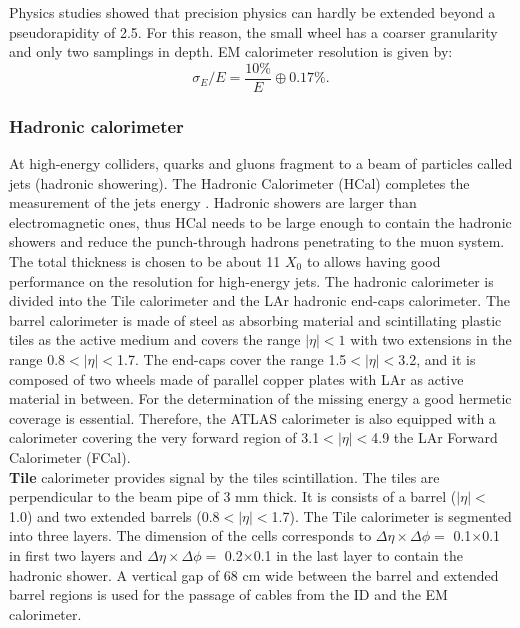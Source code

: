 Physics studies showed that precision physics can hardly be extended beyond a pseudorapidity of 2.5. For this reason, the small wheel has a coarser granularity and only two samplings in depth. EM calorimeter resolution is given by:
\begin{equation}
    \sigma_E/E = \frac{10\%}{E} \oplus 0.17\%.
\end{equation}

\subsubsection{Hadronic calorimeter}
\label{chap2:ATLAS:Calo:HCAL}
 At high-energy colliders, quarks and gluons fragment to a beam of particles called jets (hadronic showering). The Hadronic Calorimeter (HCal) completes the measurement of the jets energy \cite{Tile_TDR}. Hadronic showers are larger than electromagnetic ones, thus HCal needs to be large enough to contain the hadronic showers and reduce the punch-through hadrons penetrating to the muon system. The total thickness is chosen to be about 11 $X_0$ to allows having good performance on the resolution for high-energy jets. The hadronic calorimeter is divided into the Tile calorimeter and the LAr hadronic end-caps calorimeter. The barrel calorimeter is made of steel as absorbing material and scintillating plastic tiles as the active medium and covers the range $|\eta|<1$ with two extensions in the range 0.8$<|\eta|<$1.7. The end-caps cover the range 1.5$<|\eta|<$3.2, and it is composed of two wheels made of parallel copper plates with LAr as active material in between. For the determination of the missing energy a good hermetic coverage is essential. Therefore, the ATLAS calorimeter is also equipped with a calorimeter covering the very forward region of 3.1$<|\eta|<$4.9 the LAr Forward Calorimeter (FCal). \\
 
\textbf{Tile} calorimeter provides signal by the tiles scintillation. The tiles are perpendicular to the beam pipe of 3 mm thick. It is consists of a barrel ($|\eta|<$1.0) and two extended barrels (0.8$<|\eta|<$1.7). The Tile calorimeter is segmented into three layers. The dimension of the cells corresponds to $\Delta\eta\times\Delta\phi=$ 0.1$\times$0.1 in first two layers and $\Delta\eta\times\Delta\phi=$ 0.2$\times$0.1 in the last layer to contain the hadronic shower. A vertical gap of 68 cm wide between the barrel and extended barrel regions is used for the passage of cables from the ID and the EM calorimeter. \\
 
